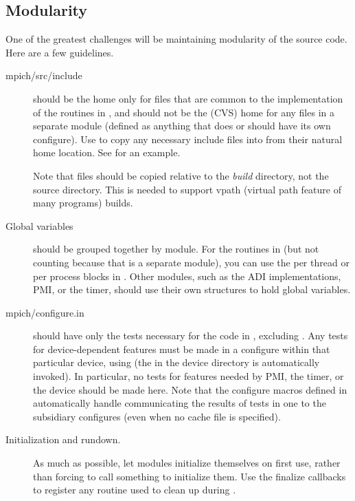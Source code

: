 \documentclass{article}
\begin{document}
\subsection{Modularity}
\label{sec:modularity}
One of the greatest challenges will be maintaining modularity of the source
code.  Here are a few guidelines.

\begin{description}
\item[mpich/src/include] should be the home only for files that are
  common to 
the implementation of the routines in , and should not be
the 
(CVS) home for any files in a separate module (defined as anything that does
or should have its own configure).  Use  to copy any
necessary include files into  from their natural home
location.  See  for an
example. 

Note that files should be copied relative to the \emph{build}
directory, not the source directory.  This is needed to support vpath
(virtual path feature of many  programs) builds.

\item[Global variables] should be grouped together by module.  For the routines
in  (but not counting  because that is
a separate 
module), you can use the per thread or per process blocks in
.  Other modules, such as the ADI implementations,
PMI, 
or the timer, should use their own structures to hold global variables. 

\item[mpich/configure.in] should have only the tests necessary for the
  code in 
, excluding  .  Any tests for
device-dependent features 
must be made in a configure within that particular device, using
 (the  in the device directory
is automatically invoked).  In particular, no tests for features needed by
PMI, the 
timer, or the device should be made here.  Note that the configure
macros defined in  automatically handle communicating the
results of tests in one  to the subsidiary configures
(even when no cache file is specified).

\item[Initialization and rundown.] As much as possible, let modules initialize 
themselves on first use, rather than forcing  to call
something 
to initialize them.  Use the finalize callbacks to register any routine used
to clean up during . 
\end{description}
\end{document}
